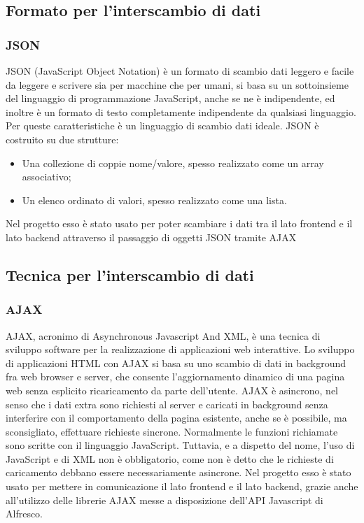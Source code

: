 \subsection{Formato per l’interscambio di dati}
\subsubsection{JSON}
JSON (JavaScript Object Notation) è un formato di scambio dati leggero e facile
da leggere e scrivere sia per macchine che per umani, si basa su un sottoinsieme del
linguaggio di programmazione JavaScript, anche se ne è indipendente, ed  inoltre è un formato di testo completamente indipendente da qualsiasi linguaggio.
Per queste caratteristiche è un linguaggio di scambio dati ideale. JSON è costruito su
due strutture:
\begin{itemize}
\item Una collezione di coppie nome/valore, spesso realizzato come un array associativo;
\item Un elenco ordinato di valori, spesso realizzato come una lista.
\end{itemize}
Nel progetto esso è stato usato per poter scambiare i dati tra il lato frontend e il lato backend attraverso il passaggio di oggetti JSON tramite AJAX
\subsection{Tecnica per l’interscambio di dati}
\subsubsection{AJAX}
AJAX, acronimo di Asynchronous Javascript And XML, è una tecnica di sviluppo
software per la realizzazione di applicazioni web interattive.
Lo sviluppo di applicazioni HTML con AJAX si basa su uno scambio di dati in
background fra web browser e server, che consente l’aggiornamento dinamico di una
pagina web senza esplicito ricaricamento da parte dell’utente.
AJAX è asincrono, nel senso che i dati extra sono richiesti al server e caricati in
background senza interferire con il comportamento della pagina esistente, anche se è possibile, ma sconsigliato, effettuare richieste sincrone. Normalmente
le funzioni richiamate sono scritte con il linguaggio JavaScript. Tuttavia, e a dispetto
del nome, l’uso di JavaScript e di XML non è obbligatorio, come non è detto che le
richieste di caricamento debbano essere necessariamente asincrone.
Nel progetto esso è stato usato per mettere in comunicazione il lato frontend e il lato backend, grazie anche all'utilizzo delle librerie AJAX messe a disposizione dell'API Javascript di Alfresco.
